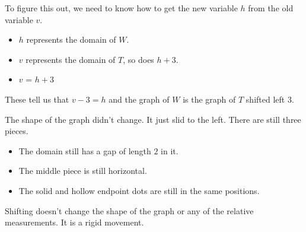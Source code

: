 \documentclass{ximera}
\begin{document}
\begin{example}
To figure this out, we need to know how to get the new variable $h$ from the old variable $v$. 




\begin{itemize}
\item $h$ represents the domain of $W$. 
\item $v$ represents the domain of $T$, so does $h+3$.  
\item $v$ = $h+3$
\end{itemize}


These tell us that $v-3 = h$ and the graph of $W$ is the graph of $T$ shifted left $3$.



\end{example}


The shape of the graph didn't change. It just slid to the left. There are still three pieces. 



\begin{itemize}
\item The domain still has a gap of length $2$ in it.  
\item The middle piece is still horizontal.  
\item The solid and hollow endpoint dots are still in the same positions. 
\end{itemize}





Shifting doesn't change the shape of the graph or any of the relative measurements. It is a rigid movement.
\end{document}
